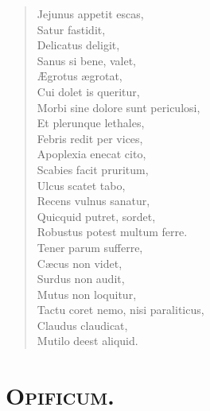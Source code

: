 \begin{verse}

  Jejunus appetit escas,\\
  Satur fastidit,\\
  Delicatus deligit,\\
  Sanus si bene, valet,\\
  Ægrotus ægrotat,\\
  Cui dolet is queritur,\\
  Morbi sine dolore sunt periculosi,\\
  Et plerunque lethales,\\
  Febris redit per vices,\\
  Apoplexia enecat cito,\\
  Scabies facit pruritum,\\
  Ulcus scatet tabo,\\
  Recens vulnus sanatur,\\
  Quicquid putret, sordet,\\
  Robustus potest multum ferre.\\
  Tener parum sufferre,\\
  Cæcus non videt,\\
  Surdus non audit,\\
  Mutus non loquitur,\\
  Tactu coret nemo, nisi paraliticus,\\
  Claudus claudicat,\\
  Mutilo deest aliquid.\\
\end{verse}



\section*{\textsc{Opificum.}}



